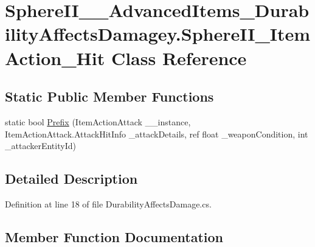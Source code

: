\hypertarget{class_sphere_i_i_____advanced_items___durability_affects_damagey_1_1_sphere_i_i___item_action___hit}{}\section{Sphere\+I\+I\+\_\+\+\_\+\+Advanced\+Items\+\_\+\+Durability\+Affects\+Damagey.\+Sphere\+I\+I\+\_\+\+Item\+Action\+\_\+\+Hit Class Reference}
\label{class_sphere_i_i_____advanced_items___durability_affects_damagey_1_1_sphere_i_i___item_action___hit}
\subsection*{Static Public Member Functions}
\begin{DoxyCompactItemize}
\item 
static bool \mbox{\hyperlink{class_sphere_i_i_____advanced_items___durability_affects_damagey_1_1_sphere_i_i___item_action___hit_a941769ac5de8a9ec29fc7a88083ef8e8}{Prefix}} (Item\+Action\+Attack \+\_\+\+\_\+instance, Item\+Action\+Attack.\+Attack\+Hit\+Info \+\_\+attack\+Details, ref float \+\_\+weapon\+Condition, int \+\_\+attacker\+Entity\+Id)
\end{DoxyCompactItemize}


\subsection{Detailed Description}


Definition at line 18 of file Durability\+Affects\+Damage.\+cs.



\subsection{Member Function Documentation}
\mbox{\label{class_sphere_i_i_____advanced_items___durability_affects_damagey_1_1_sphere_i_i___item_action___hit_a941769ac5de8a9ec29fc7a88083ef8e8}} 
